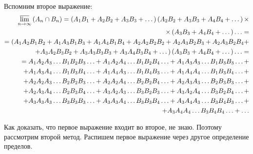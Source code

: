 \begin{enumerate}[label=\alph*)]
Вспомним второе выражение:
\begin{equation*}
\begin{split}
\varlimsup \limits_{ n \to \infty } \left( A_n \cap B_n \right) =
\left( A_1 B_1 + A_2 B_2 + A_3 B_3 + \dotsc \right) \left( A_2 B_2 + A_3 B_3 + A_4 B_4 + \dotsc \right) \times \\
\times \left(A_3 B_3 + A_4 B_4 + \dotsc \right) \dotsc = \\
= ( A_1 A_2 B_1 B_2 + A_1 A_3 B_1 B_3 + A_1 A_4 B_1 B_4 + A_2 A_2 B_2 B_2 + A_2 A_3 B_2 B_3 + A_2 A_3 B_2 B_4 + \\
+ A_3 A_2 B_3 B_2 + A_3 A_3 B_3 B_3 + A_3 A_4 B_3 B_4 + \dotsc) \left(A_3 B_3 + A_4 B_4 + \dotsc  \right) \dotsc = \\
= A_1 A_2 A_3 \dotsc B_1 B_2 B_3 \dotsc + A_1 A_2 A_4 \dotsc B_1 B_2 B_4 \dotsc + A_1 A_3 A_3 \dotsc B_1 B_3 B_3 \dotsc + \\
+ A_1 A_3 A_4 \dotsc B_1 B_3 B_4 \dotsc + A_1 A_4 A_3 \dotsc B_1 B_4 B_3 \dotsc + A_1 A_4 A_4 \dotsc B_1 B_3 B_4 \dotsc + \\
+ A_2 A_2 A_3 \dotsc B_2 B_2 B_3 \dotsc + A_2 A_2 A_4 \dotsc B_2 B_2 B_4 \dotsc + A_2 A_3 A_3 \dotsc B_2 B_3 B_3 \dotsc + \\
+ A_2 A_3 A_4 \dotsc B_2 B_3 B_4 \dotsc + A_3 A_2 A_3 \dotsc B_3 B_2 B_3 \dotsc + A_3 A_2 A_4 \dotsc B_3 B_2 B_4 \dotsc + \\
+ A_3 A_3 A_3 \dotsc B_3 B_3 B_3 \dotsc + A_3 A_3 A_4 \dotsc B_3 B_3 B_4 \dotsc + A_3 A_4 A_3 \dotsc B_3 B_4 B_3 \dotsc + \\
+ A_3 A_4 A_4 \dotsc B_3 B_4 B_4 \dotsc + \dotsc
\end{split}
\end{equation*}

Как доказать, что первое выражение входит во второе, не знаю. Поэтому рассмотрим второй метод. Распишем первое выражение через другое определение пределов.


\end{enumerate}
